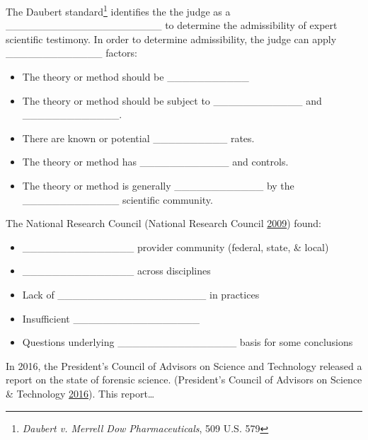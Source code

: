 \documentclass[]{book}
\providecommand{\tightlist}{%
  \setlength{\itemsep}{0pt}\setlength{\parskip}{0pt}}
\let\rmarkdownfootnote\footnote%
\def\footnote{\protect\rmarkdownfootnote}
\theoremstyle{definition}
\theoremstyle{definition}
\theoremstyle{remark}
\begin{document}
The Daubert standard\footnote{\emph{Daubert v. Merrell Dow
  Pharmaceuticals}, 509 U.S. 579} identifies the the judge as a
\_\_\_\_\_\_\_\_\_\_\_\_\_\_\_\_\_\_\_\_\_ to determine the
admissibility of expert scientific testimony. In order to determine
admissibility, the judge can apply \_\_\_\_\_\_\_\_\_\_\_\_\_ factors:
\vspace{.1in}

\begin{itemize}
\tightlist
\item
  The theory or method should be \_\_\_\_\_\_\_\_\_\_\_ \vspace{.1in}
\item
  The theory or method should be subject to \_\_\_\_\_\_\_\_\_\_\_\_ and
  \_\_\_\_\_\_\_\_\_\_\_\_\_. \vspace{.1in}
\item
  There are known or potential \_\_\_\_\_\_\_\_\_\_ rates.\vspace{.1in}
\item
  The theory or method has \_\_\_\_\_\_\_\_\_\_\_\_ and
  controls.\vspace{.1in}
\item
  The theory or method is generally \_\_\_\_\_\_\_\_\_\_\_\_ by the
  \_\_\_\_\_\_\_\_\_\_\_\_\_ scientific community.
\end{itemize}

The National Research Council (National Research Council
\protect\hyperlink{ref-nrc09}{2009}) found:\vspace{.1in}

\begin{itemize}
\tightlist
\item
  \_\_\_\_\_\_\_\_\_\_\_\_\_\_\_ provider community (federal, state, \&
  local) \vspace{.1in}
\item
  \_\_\_\_\_\_\_\_\_\_\_\_\_\_\_ across disciplines \vspace{.1in}
\item
  Lack of \_\_\_\_\_\_\_\_\_\_\_\_\_\_\_\_\_\_\_\_ in practices
  \vspace{.1in}
\item
  Insufficient \_\_\_\_\_\_\_\_\_\_\_\_\_\_\_\_\_ \vspace{.1in}
\item
  Questions underlying \_\_\_\_\_\_\_\_\_\_\_\_\_\_\_\_ basis for some
  conclusions
\end{itemize}

In 2016, the President's Council of Advisors on Science and Technology
released a report on the state of forensic science. (President's Council
of Advisors on Science \& Technology
\protect\hyperlink{ref-pcast}{2016}). This report\ldots{} \vspace{.1in}
\end{document}
